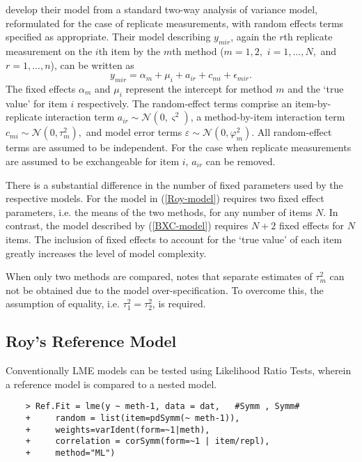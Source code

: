 \documentclass[12pt, a4paper]{report}
\theoremstyle{plain}
\theoremstyle{definition}
\theoremstyle{remark}
\begin{document}
\bigskip


\bigskip

\citet{BXC2008} develop their model from a standard two-way analysis of variance model, reformulated for the case of replicate measurements, with random effects terms specified as appropriate. 
Their model describing $y_{mir} $, again the $r$th replicate measurement on the $i$th item by the $m$th method ($m=1,2,$ $i=1,\ldots,N,$ and $r = 1,\ldots,n$), can be written as
\begin{equation}\label{BXC-model}
y_{mir}  = \alpha_{m} + \mu_{i} + a_{ir} + c_{mi} + \epsilon_{mir}.
\end{equation}
The fixed effects $\alpha_{m}$ and $\mu_{i}$  represent the intercept for method $m$ and the `true value' for item $i$ respectively. The random-effect terms comprise an item-by-replicate interaction term $a_{ir} \sim \mathcal{N}(0,\varsigma^{2})$, a method-by-item interaction term $c_{mi} \sim \mathcal{N}(0,\tau^{2}_{m}),$ and model error terms $\varepsilon \sim \mathcal{N}(0,\varphi^{2}_{m}).$ All random-effect terms are assumed to be independent.
For the case when replicate measurements are assumed to be exchangeable for item $i$, $a_{ir}$ can be removed.

There is a substantial difference in the number of fixed parameters used by the respective models. For the model in (\ref{Roy-model}) requires two fixed effect parameters, i.e. the means of the two methods, for any number of items $N$. In contrast, the model described by (\ref{BXC-model}) requires $N+2$ fixed effects for $N$ items. The inclusion of fixed effects to account for the `true value' of each item greatly increases the level of model complexity.

When only two methods are compared, \citet{BXC2008} notes that separate estimates of $\tau^2_m$ can not be obtained due to the model over-specification. To overcome this, the assumption of equality, i.e. $\tau^2_1 = \tau^2_2$, is required.




\newpage
\subsection{Roy's Reference Model}
Conventionally LME models can be tested using Likelihood Ratio Tests, wherein a reference model is compared to a nested model.
\begin{framed}
	\begin{verbatim}
	> Ref.Fit = lme(y ~ meth-1, data = dat,   #Symm , Symm#
	+     random = list(item=pdSymm(~ meth-1)), 
	+     weights=varIdent(form=~1|meth),
	+     correlation = corSymm(form=~1 | item/repl), 
	+     method="ML")
	\end{verbatim}
\end{framed}
\end{document}

